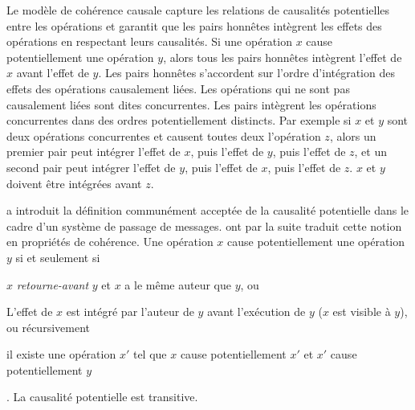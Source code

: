 Le modèle de cohérence causale capture les relations de causalités potentielles entre les opérations et garantit que les pairs honnêtes intègrent les effets des opérations en respectant leurs causalités.
Si une opération $x$ cause potentiellement une opération $y$, alors tous les pairs honnêtes intègrent l'effet de $x$ avant l'effet de $y$.
Les pairs honnêtes s'accordent sur l'ordre d'intégration des effets des opérations causalement liées.
Les opérations qui ne sont pas causalement liées sont dites concurrentes.
Les pairs intègrent les opérations concurrentes dans des ordres potentiellement distincts.
Par exemple si $x$ et $y$ sont deux opérations concurrentes et causent toutes deux l'opération $z$, alors un premier pair peut intégrer l'effet de $x$, puis l'effet de $y$, puis l'effet de $z$, et un second pair peut intégrer l'effet de $y$, puis l'effet de $x$, puis l'effet de $z$.
$x$ et $y$ doivent être intégrées avant $z$.

\textcite{lamport_1978_time} a introduit la définition communément acceptée de la causalité potentielle dans le cadre d'un système de passage de messages.
\textcite{hutto_1990_causal} ont par la suite traduit cette notion en propriétés de cohérence.
Une opération $x$ cause potentiellement une opération $y$ si et seulement si \begin{inlinelist}
    \item $x$ \emph{retourne-avant} $y$ et $x$ a le même auteur que $y$, ou
    \item L'effet de $x$ est intégré par l'auteur de $y$ avant l'exécution de $y$ ($x$ est visible à $y$), ou récursivement
    \item il existe une opération $x'$ tel que $x$ cause potentiellement $x'$ et $x'$ cause potentiellement $y$
\end{inlinelist}.
La causalité potentielle est transitive.

